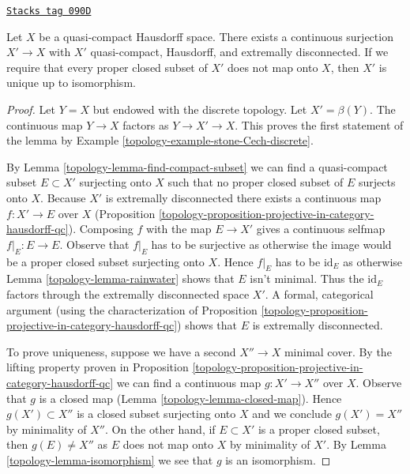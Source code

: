 \begin{lemma}
\label{topology-lemma-existence-projective-cover}
\href{https://stacks.math.columbia.edu/tag/090D}{\texttt{Stacks tag 090D}}


Let $X$ be a quasi-compact Hausdorff space.
There exists a continuous surjection $X' \to X$ with $X'$
quasi-compact, Hausdorff, and extremally disconnected.
If we require that every proper closed subset of $X'$ does not
map onto $X$, then $X'$ is unique up to isomorphism.
\end{lemma}

\begin{proof}

Let $Y = X$ but endowed with the discrete topology. Let $X' = \beta(Y)$.
The continuous map $Y \to X$ factors as $Y \to X' \to X$. This
proves the first statement of the lemma by
Example \ref{topology-example-stone-Cech-discrete}.

\medskip\noindent
By Lemma \ref{topology-lemma-find-compact-subset} we can find a quasi-compact subset
$E \subset X'$ surjecting onto $X$ such that no proper closed subset of $E$
surjects onto $X$.
Because $X'$ is extremally disconnected there exists a continuous map
$f : X' \to E$ over $X$
(Proposition \ref{topology-proposition-projective-in-category-hausdorff-qc}).
Composing $f$ with the map $E \to X'$ gives a continuous selfmap
$f|_E : E \to E$. Observe that $f|_E$ has to be surjective as otherwise
the image would be a proper closed subset surjecting onto $X$.
Hence $f|_E$ has to be $\text{id}_E$ as otherwise
Lemma \ref{topology-lemma-rainwater} shows that $E$ isn't minimal.
Thus the $\text{id}_E$ factors through the extremally disconnected
space $X'$. A formal, categorical argument (using the characterization of
Proposition \ref{topology-proposition-projective-in-category-hausdorff-qc})
shows that $E$ is extremally disconnected.

\medskip\noindent
To prove uniqueness, suppose we have a second $X'' \to X$
minimal cover. By the lifting property proven in
Proposition \ref{topology-proposition-projective-in-category-hausdorff-qc}
we can find a continuous map $g : X' \to X''$ over $X$.
Observe that $g$ is a closed map (Lemma \ref{topology-lemma-closed-map}).
Hence $g(X') \subset X''$ is a closed subset surjecting onto $X$
and we conclude $g(X') = X''$ by minimality of $X''$.
On the other hand, if $E \subset X'$ is a proper closed subset,
then $g(E) \not = X''$ as $E$ does not map onto $X$ by minimality
of $X'$. By Lemma \ref{topology-lemma-isomorphism} we see that $g$ is an isomorphism.
\end{proof}

